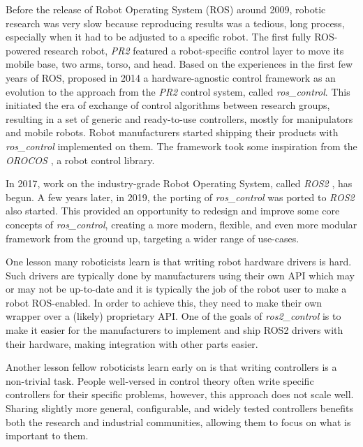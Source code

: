 \documentclass[journal]{IEEEtran}
\newcommand{\comment}[1]{}
\begin{document}
Before the release of Robot Operating System (ROS) \cite{ref_ros} around 2009, robotic research was very slow because reproducing results was a tedious, long process, especially when it had to be adjusted to a specific robot. The first fully ROS-powered research robot, \emph{PR2} featured a robot-specific control layer to move its mobile base, two arms, torso, and head.
Based on the experiences in the first few years of ROS, \cite{ref_roscontrol} proposed in 2014 a hardware-agnostic control framework as an evolution to the approach from the \emph{PR2} control system, called \emph{ros\_control}. This initiated the era of exchange of control algorithms between research groups, resulting in a set of generic and ready-to-use controllers, mostly for manipulators and mobile robots. Robot manufacturers started shipping their products with \emph{ros\_control} implemented on them. The framework took some inspiration from the \emph{OROCOS} \cite{ref_orocos}, a robot control library.

In 2017, work on the industry-grade Robot Operating System, called \emph{ROS2} \cite{ref_ros2}, has begun. A few years later, in 2019, the porting of \emph{ros\_control} was ported to \emph{ROS2} also started. This provided an opportunity to redesign and improve some core concepts of \emph{ros\_control}, creating a more modern, flexible, and even more modular framework from the ground up, targeting a wider range of use-cases.


One lesson many roboticists learn is that writing robot hardware drivers is hard. Such drivers are typically done by manufacturers using their own API which may or may not be up-to-date and it is typically the job of the robot user to make a robot ROS-enabled. In order to achieve this, they need to make their own wrapper over a (likely) proprietary API. One of the goals of \emph{ros2\_control} is to make it easier for the manufacturers to implement and ship ROS2 drivers with their hardware, making integration with other parts easier.

Another lesson fellow roboticists learn early on is that writing controllers is a non-trivial task.
People well-versed in control theory often write specific controllers for their specific problems, however, this approach does not scale well.
Sharing slightly more general, configurable, and widely tested controllers benefits both the research and industrial communities, allowing them to focus on what is important to them.
\comment{The more a controller is used, the quicker achieves maturity, helping robots be safe and reliable in harsh deployment environments or places where they need to interact with humans.}
\end{document}
